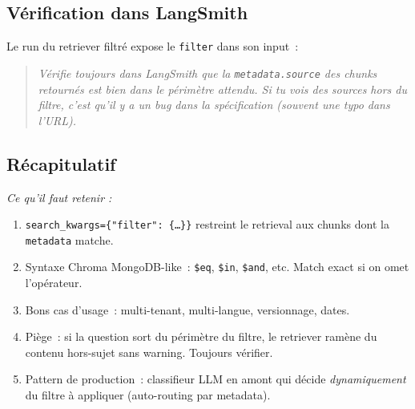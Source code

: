 \documentclass[11pt,a4paper]{article}
\begin{document}
\subsection{Vérification dans LangSmith}

Le run du retriever filtré expose le \texttt{filter} dans son input~:

\begin{center}
\end{center}

\begin{quote}\itshape
Vérifie toujours dans LangSmith que la \texttt{metadata.source} des
chunks retournés est bien dans le périmètre attendu. Si tu vois des
sources hors du filtre, c'est qu'il y a un bug dans la spécification
(souvent une typo dans l'URL).
\end{quote}

\subsection*{Récapitulatif}
{\itshape\sloppy
\textit{Ce qu'il faut retenir :}
\begin{enumerate}[leftmargin=*]
  \item \texttt{search\_kwargs=\{"filter": \{\dots\}\}} restreint le
        retrieval aux chunks dont la \texttt{metadata} matche.
  \item Syntaxe Chroma MongoDB-like~: \texttt{\$eq}, \texttt{\$in},
        \texttt{\$and}, etc. Match exact si on omet l'opérateur.
  \item Bons cas d'usage~: multi-tenant, multi-langue, versionnage,
        dates.
  \item Piège~: si la question sort du périmètre du filtre, le retriever
        ramène du contenu hors-sujet sans warning. Toujours vérifier.
  \item Pattern de production~: classifieur LLM en amont qui décide
        \emph{dynamiquement} du filtre à appliquer (auto-routing par
        metadata).
\end{enumerate}
\par}
\end{document}
